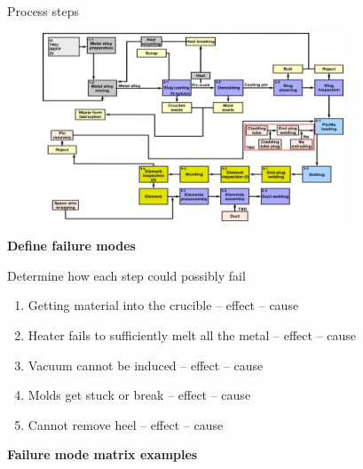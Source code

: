 \documentclass[aspectratio=1610,pdftex,dvipsnames,compress,xcolor={dvipsnames}]{beamer}
\begin{document}
\begin{frame}{Process steps}
    \begin{figure}
        \centering
        \includegraphics[width=0.80\textwidth]{fuel.fabrication.process.steps.jpg}
    \end{figure}
\end{frame}


\begin{frame}[plain]{}
    \centering\LARGE\textbf{Define failure modes}
\end{frame}


\addtocounter{framenumber}{-1}
\begin{frame}{Determine how each step could possibly fail}
    \begin{enumerate}[series=outerlist,topsep=0pt,itemsep=21pt,leftmargin=*,label=(\arabic*)]
        \item[]Getting material into the crucible -- effect -- cause
        \item[]Heater fails to sufficiently melt all the metal -- effect -- cause
        \item[]Vacuum cannot be induced -- effect -- cause
        \item[]Molds get stuck or break -- effect -- cause
        \item[]Cannot remove heel -- effect -- cause
    \end{enumerate}
\end{frame}


\begin{frame}[plain]{}
    \centering\LARGE\textbf{Failure mode matrix examples}
\end{frame}
\end{document}
